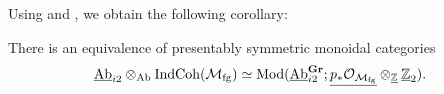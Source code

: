 
Using  and , we obtain the following corollary:

\begin{cor}\label{lem:uMU-koszul}
  There is an equivalence of presentably symmetric monoidal categories
  \[ \underline{\mathrm{Ab}}_{i2} \otimes_{\mathrm{Ab}} \mathrm{IndCoh}(\mathcal{M}_{\mathrm{fg}}) \simeq \mathrm{Mod} ( \underline{\mathrm{Ab}}_{i2}^{\operatorname{\mathbf{Gr}}}; \underline{p_*\mathcal{O}_{\mathcal{M}_{\mathrm{fg}}}} \otimes_{\underline{\mathbb{Z}}} \underline{\mathbb{Z}}_{2} ).  \]
\end{cor}



